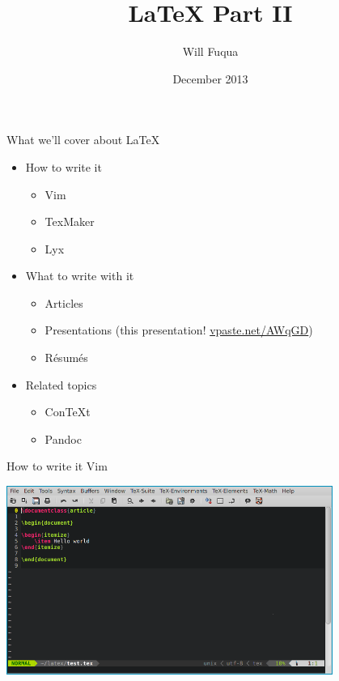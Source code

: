 \documentclass{beamer}
\author{Will Fuqua}
\title{\LaTeX{} Part II}
\institute{Michigan!/usr/group}
\date{December 2013}
\begin{document}
\begin{frame}[t,plain]
    \titlepage
\end{frame}

\begin{frame}[t]{What we'll cover about \LaTeX}
    \begin{itemize}
        \item How to write it
            \begin{itemize}
                \item Vim
                \item TexMaker
                \item Lyx
            \end{itemize}
            \pause
        \item What to write with it
            \begin{itemize}
                \item Articles
                \item Presentations 
                    (this presentation! \href{http://vpaste.net/AWqGD}{vpaste.net/AWqGD})
                \item R\'{e}sum\'{e}s
            \end{itemize}
            \pause
        \item Related topics
            \begin{itemize}
                \item ConTeXt
                \item Pandoc
            \end{itemize}
    \end{itemize}
\end{frame}

\begin{frame}{How to write it \textendash{} Vim}
    \begin{center}
        \includegraphics[width=0.8\textwidth]{img/vim}
    \end{center}
\end{frame}
\end{document}
